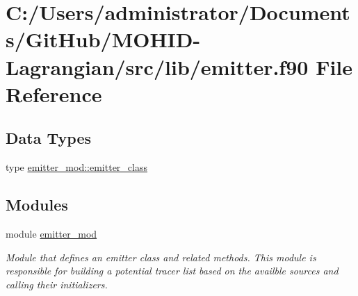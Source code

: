 \hypertarget{emitter_8f90}{}\section{C\+:/\+Users/administrator/\+Documents/\+Git\+Hub/\+M\+O\+H\+I\+D-\/\+Lagrangian/src/lib/emitter.f90 File Reference}
\label{emitter_8f90}
\subsection*{Data Types}
\begin{DoxyCompactItemize}
\item 
type \mbox{\hyperlink{structemitter__mod_1_1emitter__class}{emitter\+\_\+mod\+::emitter\+\_\+class}}
\end{DoxyCompactItemize}
\subsection*{Modules}
\begin{DoxyCompactItemize}
\item 
module \mbox{\hyperlink{namespaceemitter__mod}{emitter\+\_\+mod}}
\begin{DoxyCompactList}\small\item\em Module that defines an emitter class and related methods. This module is responsible for building a potential tracer list based on the availble sources and calling their initializers. \end{DoxyCompactList}\end{DoxyCompactItemize}
